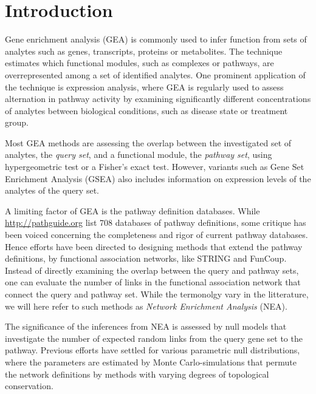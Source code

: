 \documentclass[10pt,letterpaper]{article}
\begin{document}
\section*{Introduction}

Gene enrichment analysis (GEA) is commonly used to infer function from sets of analytes such as genes, transcripts, proteins or metabolites\cite{tavazoie1999systematic,khatri2012ten}. The technique estimates which functional modules, such as complexes or pathways, are overrepresented among a set of identified analytes. One prominent application of the technique is expression analysis, where GEA is regularly used to assess alternation in pathway activity by examining significantly different concentrations of analytes between biological conditions, such as disease state or treatment group.

Most GEA methods are assessing the overlap between the investigated set of analytes, the {\em query set}, and a functional module, the {\em pathway set}, using hypergeometric test or a Fisher's exact test. However, variants such as Gene Set Enrichment Analysis (GSEA)\cite{subramanian2005gene} also includes information on expression levels of the analytes of the query set.

A limiting factor of GEA is the pathway definition databases. While \url{http://pathguide.org} list 708 databases of pathway definitions\cite{bader2006pathguide},  some critique has been voiced concerning the completeness and rigor of current pathway databases. Hence efforts have been directed to designing methods that extend the pathway definitions, by functional association networks, like STRING\cite{szklarczyk2014string} and FunCoup\cite{ogris2017funcoup}. Instead of directly examining the overlap between the query and pathway sets, one can evaluate the number of links in the functional association network that connect the query and pathway set\cite{alexeyenko2012network, glaab2012enrichnet, mccormack2013statistical, ogris2016novel, signorelli2016neat}. While the termonolgy vary in the litterature, we will here refer to such methods as {\em Network Enrichment Analysis} (NEA).

The significance of the inferences from NEA is assessed by null models that investigate the number of expected random links from the query gene set to the pathway. Previous efforts have settled for various parametric null distributions, where the parameters are estimated by Monte Carlo-simulations that permute the network definitions by methods with varying degrees of topological conservation.
\end{document}

